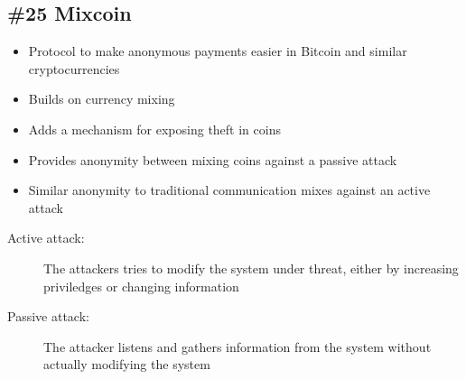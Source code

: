 \subsection{\#25 Mixcoin}
\begin{itemize}
	\item Protocol to make anonymous payments easier in Bitcoin and similar cryptocurrencies
	\item Builds on currency mixing
	\item Adds a mechanism for exposing theft in coins
	\item Provides anonymity between mixing coins against a passive attack
	\item Similar anonymity to traditional communication mixes against an active attack
\end{itemize}
\begin{description}
	\item[Active attack:] The attackers tries to modify the system under threat, either by increasing priviledges or changing information
	\item[Passive attack:] The attacker listens and gathers information from the system without actually modifying the system
\end{description}